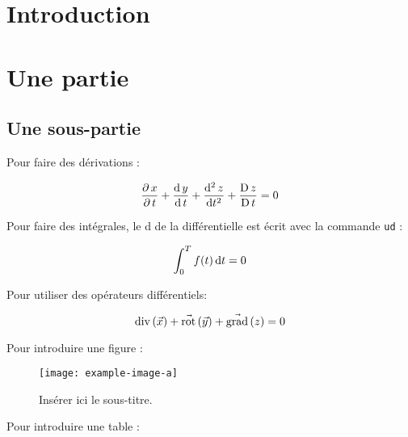 \documentclass[a4paper,12pt,french]{article}
\begin{document}

\thispagestyle{empty}
\tableofcontents


\section{Introduction}






\newpage
\section{Une partie}
\subsection{Une sous-partie}


Pour faire des dérivations :

\[
    \dfrac{\partial\, x}{\partial\, t} + \dfrac{\mathrm{d}\, y}{\mathrm{d}\, t} + \dfrac{\mathrm{d}^2\, z}{\mathrm{d} t^2} + \dfrac{\mathrm{D}\, z}{\mathrm{D}\, t} = 0
\]



Pour faire des intégrales, le d de la différentielle est écrit avec la commande \texttt{ud} :

\[
    \int_0^T f(t) \, \mathrm{d} t = 0
\]



Pour utiliser des opérateurs différentiels:

\[
    \mathrm{div}\left( \vec{x} \right) + \vec{\mathrm{rot}}\left( \vec{y} \right) + \vec{\mathrm{grad}}\left( z \right) = 0
\]




Pour introduire une figure : 

\begin{figure}[ht!]
    \centering
    \texttt{[image: example-image-a]}
    \caption{Insérer ici le sous-titre.}
    \label{fig:id-de-la-figure}
\end{figure}




Pour introduire une table : 
\end{document}
